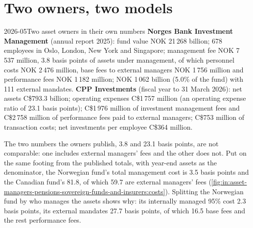 \section{Two owners, two models}

\begin{dated}{2026-05}{Two asset owners in their own numbers}\label{dat:in:asset-managers-pensions-sovereign-funds-and-insurers:owners}
\textbf{Norges Bank Investment Management} (annual report 2025): fund value NOK 21\,268 billion; 678 employees in Oslo,
London, New York and Singapore; management fee NOK 7\,537 million, 3.8 basis points of assets under management, of which
personnel costs NOK 2\,476 million, base fees to external managers NOK 1\,756 million and performance fees NOK 1\,182
million; NOK 1\,062 billion (5.0\% of the fund) with 111 external mandates. \textbf{CPP Investments} (fiscal year to 31
March 2026): net assets C\$793.3 billion; operating expenses C\$1\,757 million (an operating expense ratio of 23.1 basis
points); C\$1\,976 million of investment management fees and C\$2\,758 million of performance fees paid to external
managers; C\$753 million of transaction costs; net investments per employee C\$364 million.
\end{dated}

The two numbers the owners publish, 3.8 and 23.1 basis points, are not comparable: one includes external managers' fees
and the other does not. Put on the same footing from the published totals, with year-end assets as the denominator, the
Norwegian fund's total management cost is 3.5 basis points and the Canadian fund's 81.8, of which 59.7 are external
managers' fees (\cref{fig:in:asset-managers-pensions-sovereign-funds-and-insurers:costs}). Splitting the Norwegian fund
by who manages the assets shows why: its internally managed 95\% cost 2.3 basis points, its external mandates 27.7
basis points, of which 16.5 base fees and the rest performance fees.

